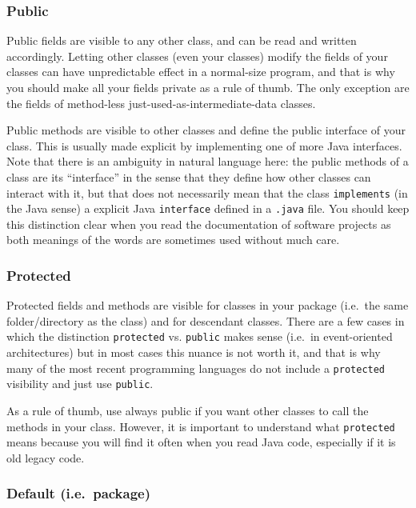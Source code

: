 \subsubsection*{Public}
\label{sec:public}

Public fields are visible to any other class, and can be read and
written accordingly. Letting other classes (even your classes) modify
the fields of your classes can have unpredictable effect in a
normal-size program, and that is why you should make all your fields
private as a rule of thumb. The only exception are the fields of
method-less just-used-as-intermediate-data classes. 

Public methods are visible to other classes and define the public
interface of your class. This is usually made explicit by implementing
one of more Java interfaces. Note that there is an ambiguity in
natural language here: the public methods of a class are its ``interface''
in the sense that they define how other classes can interact with it,
but that does not necessarily mean that the class \verb+implements+
(in the Java sense) a explicit Java \verb+interface+ defined in a
\verb+.java+ file. You should keep this distinction clear when you
read the documentation of software projects as both meanings of the
words are sometimes used without much care. 

\subsubsection{Protected}
\label{sec:protected}

Protected fields and methods are visible for classes in your package
(i.e.~the same folder/directory as the class) and for descendant
classes. There are a few cases in which the distinction
\verb+protected+ vs. \verb+public+ makes sense (i.e.~in event-oriented
architectures) but in most cases this nuance is not worth it, and that
is why many of the most recent programming languages do not include a
\verb+protected+ visibility and just use \verb+public+. 

As a rule of thumb, use always public if you want other classes to
call the methods in your class. However, it is important to understand
what \verb+protected+ means because you will find it often when you
read Java code, especially if it is old legacy code. 

\subsubsection{Default (i.e.~package)}
\label{sec:default-i.e.-package}

